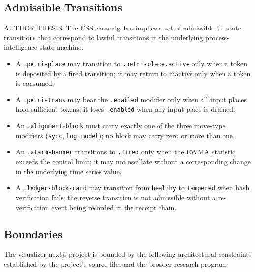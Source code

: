 \subsection{Admissible Transitions}
\label{sec:experiments-visualizer-nextjs-arch-transitions}

AUTHOR THESIS: The CSS class algebra implies a set of admissible UI state transitions that
correspond to lawful transitions in the underlying process-intelligence state machine.

\begin{itemize}
  \item A \texttt{.petri-place} may transition to \texttt{.petri-place.active} only when a
        token is deposited by a fired transition; it may return to inactive only when a token
        is consumed.
  \item A \texttt{.petri-trans} may bear the \texttt{.enabled} modifier only when all input
        places hold sufficient tokens; it loses \texttt{.enabled} when any input place is
        drained.
  \item An \texttt{.alignment-block} must carry exactly one of the three move-type modifiers
        (\texttt{sync}, \texttt{log}, \texttt{model}); no block may carry zero or more than one.
  \item An \texttt{.alarm-banner} transitions to \texttt{.fired} only when the EWMA statistic
        exceeds the control limit; it may not oscillate without a corresponding change in the
        underlying time series value.
  \item A \texttt{.ledger-block-card} may transition from \texttt{healthy} to \texttt{tampered}
        when hash verification fails; the reverse transition is not admissible without a
        re-verification event being recorded in the receipt chain.
\end{itemize}

\subsection{Boundaries}
\label{sec:experiments-visualizer-nextjs-arch-boundaries}

The visualizer-nextjs project is bounded by the following architectural constraints established
by the project's source files and the broader research program:

